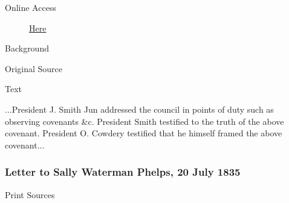 			\begin{description}
				\item[Online Access] \href{https://www.josephsmithpapers.org/paper-summary/minutes-14-july-1835/1}{Here}
			\end{description}
			
			\begin{description}
				\item[Background]
			\end{description}
			
			
			\begin{description}
				\item[Original Source]
			\end{description}
			
			
			\begin{description}
				\item[Text]
			\end{description}
			
				...President J. Smith Jun addressed the council in points of duty such as observing covenants \&c. President Smith testified to the truth of the above covenant. President O. Cowdery testified that he himself framed the above covenant...
				
		\subsubsection{Letter to Sally Waterman Phelps, 20 July 1835}
			\label{EMS-1835-JS-20-JUL-1835}
			
			\begin{description}
				\item[Print Sources]
			\end{description}

